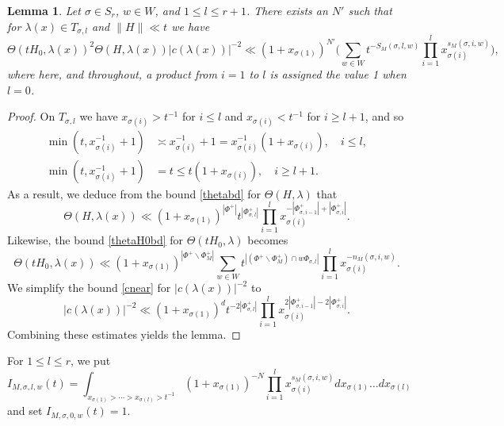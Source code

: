 \documentclass[12pt]{amsart}
\newtheorem{lemma}[theorem]{Lemma}
\theoremstyle{remark}
\begin{document}
\begin{lemma}\label{lemma:refined-bound}
Let $\sigma\in S_r$, $w\in W$, and  $1\le l\le r+1$. There exists an $N'$ such that for $\lambda(x)\in T_{\sigma,l}$ and $\|H\|\ll t$ we have
\[
 \Theta(tH_0, \lambda(x))^2 \Theta( H, \lambda(x)) |c(\lambda(x))|^{-2} \ll  (1 + x_{\sigma(1)})^{N'} \Big(\sum_{w \in W} t^{-S_M(\sigma, l,w) } \prod_{i = 1}^{l} x_{\sigma(i)}^{s_M(\sigma,i,w) }\Big),
\]
where here, and throughout, a product from $i=1$ to $l$ is assigned the value 1 when $l=0$. 
\end{lemma}
\begin{proof}
On $T_{\sigma, l}$ we have $x_{\sigma(i)} > t^{-1}$ for $i \le l$ and  $x_{\sigma(i)} < t^{-1}$ for $i \geq l+1$, and so
\begin{align*}
\min( t, x_{\sigma(i)}^{-1} +1) & \asymp x_{\sigma(i)}^{-1} + 1 = x_{\sigma(i)}^{-1}( 1 + x_{\sigma(i)}), \quad i \le l, \\
\min( t, x_{\sigma(i)}^{-1} +1) & = t \le t ( 1 + x_{\sigma(i)}), \quad i \ge l+1.
\end{align*}
%
As a result, we deduce from the bound \eqref{thetabd} for $\Theta(H, \lambda)$ that
\[
\Theta(H, \lambda(x)) \ll (1 + x_{\sigma(1)})^{|\Phi^+|} t^{|\Phi_{\sigma, l}^+| } \prod_{i = 1}^{l} x_{\sigma(i)}^{ -|\Phi_{\sigma, i-1}^+| + |\Phi_{\sigma, i}^+|}.
\]
Likewise, the bound \eqref{thetaH0bd} for $\Theta(tH_0, \lambda)$ becomes
\[
\Theta(tH_0, \lambda(x)) \ll (1 + x_{\sigma(1)})^{|\Phi^+ \smallsetminus \Phi^+_M|} \sum_{w \in W}t^{|(\Phi^+ \smallsetminus \Phi^+_M) \cap w \Phi_{\sigma, l}|}  \prod_{i = 1}^{l} x_{\sigma(i)}^{- n_M(\sigma, i, w) }.
\]
We simplify the bound \eqref{cnear} for $|c(\lambda(x))|^{-2}$ to
\[
|c(\lambda(x))|^{-2} \ll (1 + x_{\sigma(1)})^{d} t^{ - 2|\Phi_{\sigma, l}^+|} \prod_{i = 1}^{l} x_{\sigma(i)}^{ 2|\Phi_{\sigma, i-1}^+| - 2|\Phi_{\sigma, i}^+| }.
\]
Combining these estimates yields the lemma.\end{proof}

For $1\le l\le r$, we put
\begin{equation}\label{eq:defn-I-int}
I_{M,\sigma, l,w}(t)=  \int_{ x_{\sigma(1)} > \cdots > x_{\sigma(l)} > t^{-1} } (1 + x_{\sigma(1)})^{-N} \prod_{i = 1}^{l} x_{\sigma(i)}^{s_M(\sigma, i,w) } dx_{\sigma(1)} \ldots dx_{\sigma(l)}
\end{equation}
and set $I_{M,\sigma, 0,w}(t)=1$.
\end{document}
